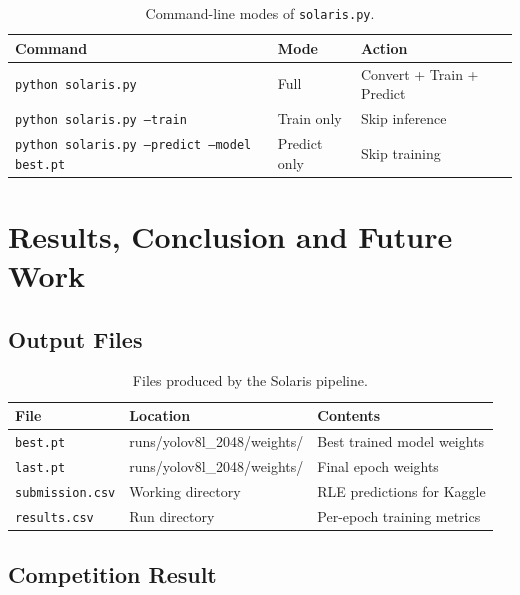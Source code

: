 \documentclass[12pt,a4paper,openany]{report}
\begin{document}
\begin{table}[H]
\centering
\caption{Command-line modes of \texttt{solaris.py}.}
\renewcommand{\arraystretch}{1.3}
\begin{tabular}{l l p{6cm}}
\toprule
\textbf{Command} & \textbf{Mode} & \textbf{Action} \\
\midrule
\texttt{python solaris.py} & Full & Convert + Train + Predict \\
\texttt{python solaris.py --train} & Train only & Skip inference \\
\texttt{python solaris.py --predict --model best.pt} & Predict only & Skip training \\
\bottomrule
\end{tabular}
\label{tab:cli}
\end{table}

\chapter{Results, Conclusion and Future Work}

\section{Output Files}

\begin{table}[H]
\centering
\caption{Files produced by the Solaris pipeline.}
\renewcommand{\arraystretch}{1.3}
\begin{tabular}{l l p{7cm}}
\toprule
\textbf{File} & \textbf{Location} & \textbf{Contents} \\
\midrule
\texttt{best.pt}        & runs/yolov8l\_2048/weights/ & Best trained model weights \\
\texttt{last.pt}        & runs/yolov8l\_2048/weights/ & Final epoch weights \\
\texttt{submission.csv} & Working directory           & RLE predictions for Kaggle \\
\texttt{results.csv}    & Run directory               & Per-epoch training metrics \\
\bottomrule
\end{tabular}
\label{tab:outputs}
\end{table}

\section{Competition Result}
\end{document}
